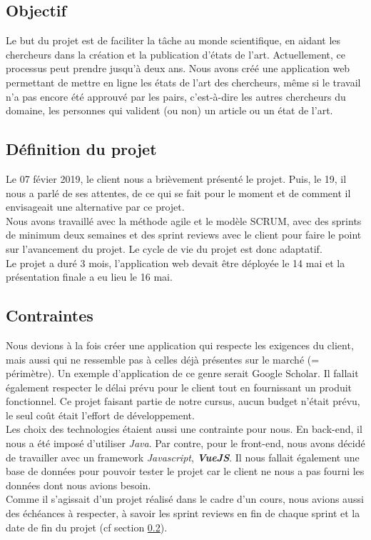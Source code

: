 \documentclass[t, 12pt, usenames,dvipsnames]{article}
\begin{document}
        \subsection{Objectif}
            \noindent Le but du projet est de faciliter la tâche au monde scientifique, en aidant les chercheurs dans la création et la publication d'états de l'art. Actuellement, ce processus peut prendre jusqu'à deux ans. Nous avons créé une application web permettant de mettre en ligne les états de l'art des chercheurs, même si le travail n'a pas encore été approuvé par les pairs, c'est-à-dire les autres chercheurs du domaine, les personnes qui valident (ou non) un article ou un état de l'art.
    
        \subsection{Définition du projet}
        \label{section:def_projet}
            \noindent Le 07 févier 2019, le client nous a brièvement présenté le projet. Puis, le 19, il nous a parlé de ses attentes, de ce qui se fait pour le moment et de comment il envisageait une alternative par ce projet.\\
            Nous avons travaillé avec la méthode agile et le modèle SCRUM, avec des sprints de minimum deux semaines et des sprint reviews avec le client pour faire le point sur l'avancement du projet. Le cycle de vie du projet est donc adaptatif.\\
            Le projet a duré 3 mois, l'application web devait être déployée le 14 mai et la présentation finale a eu lieu le 16 mai.
        
        \subsection{Contraintes}
            \noindent Nous devions à la fois créer une application qui respecte les exigences du client, mais aussi qui ne ressemble pas à celles déjà présentes sur le marché (= périmètre). Un exemple d'application de ce genre serait Google Scholar. Il fallait également respecter le délai prévu pour le client tout en fournissant un produit fonctionnel. Ce projet faisant partie de notre cursus, aucun budget n'était prévu, le seul coût était l'effort de développement.\\
            \newpage
            Les choix des technologies étaient aussi une contrainte pour nous. En back-end, il nous a été imposé d'utiliser \textit{Java}. Par contre, pour le front-end, nous avons décidé de travailler avec un framework  \textit{Javascript}, \textbf{\textit{VueJS}}. Il nous fallait également une base de données pour pouvoir tester le projet car le client ne nous a pas fourni les données dont nous avions besoin.\\
            Comme il s'agissait d'un projet réalisé dans le cadre d'un cours, nous avions aussi des échéances à respecter, à savoir les sprint reviews en fin de chaque sprint et la date de fin du projet (cf section \ref{section:def_projet}).
            
\end{document}
